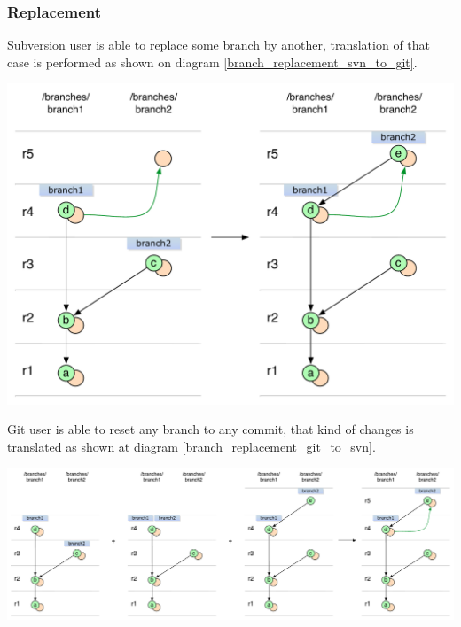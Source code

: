\subsubsection{Replacement}

Subversion user is able to replace some branch by another, translation of that case is performed as shown on diagram \ref{branch_replacement_svn_to_git}.
\begin{center}
\includegraphics[width=\linewidth]{img/diagrams/branch_replacement_svn_to_git.pdf}%
\label{branch_replacement_svn_to_git}%
\end{center}

Git user is able to reset any branch to any commit, that kind of changes is translated as shown at diagram \ref{branch_replacement_git_to_svn}.
\begin{center}
\includegraphics[width=\linewidth]{img/diagrams/branch_replacement_git_to_svn.pdf}%
\label{branch_replacement_git_to_svn}%
\end{center}